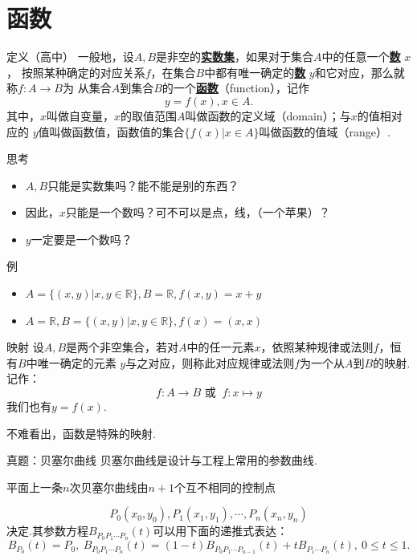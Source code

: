 \documentclass[]{beamer}
\begin{document}
\section{函数}

\begin{frame}{定义（高中）}
    一般地，设$A,B$是非空的\underline{\textbf{实数集}}，如果对于集合$A$中的任意一个\underline{\textbf{数}} $x$，
    按照某种确定的对应关系$f$，在集合$B$中都有唯一确定的\underline{\textbf{数}} $y$和它对应，那么就称$f:A\rightarrow B$为
    从集合$A$到集合$B$的一个\underline{\textbf{函数}}（function），记作
    \[
    y=f(x),x\in A.
    \]
    其中，$x$叫做自变量，$x$的取值范围$A$叫做函数的定义域（domain）；与$x$的值相对应的
    $y$值叫做函数值，函数值的集合$\{f(x)|x\in A\}$叫做函数的值域（range）.
\end{frame}

\begin{frame}{思考}
    \begin{itemize}
        \item $A,B$只能是实数集吗？能不能是别的东西？
        \item 因此，$x$只能是一个数吗？可不可以是点，线，（一个苹果）？
        \item $y$一定要是一个数吗？
    \end{itemize}
\end{frame}

\begin{frame}{例}
    \begin{itemize}
        \item $A=\{(x,y)|x,y\in \mathbb{R}\}, B=\mathbb{R},f(x,y)=x+y$
        \item $A=\mathbb{R}, B=\{(x,y)|x,y\in \mathbb{R}\}, f(x)=(x,x)$
    \end{itemize}
\end{frame}

\begin{frame}{映射}
    设$A,B$是两个非空集合，若对$A$中的任一元素$x$，依照某种规律或法则$f$，恒有$B$中唯一确定的元素
    $y$与之对应，则称此对应规律或法则$f$为一个从$A$到$B$的映射.记作：
    \[
    f:A\rightarrow B \text{ 或 }\ f:x\mapsto y
    \]
    我们也有$y=f(x)$.

    不难看出，函数是特殊的映射.
\end{frame}

\begin{frame}{真题：贝塞尔曲线}
    贝塞尔曲线是设计与工程上常用的参数曲线.

    平面上一条$n$次贝塞尔曲线由$n+1$个互不相同的控制点

    \[
    P_0(x_0,y_0), P_1(x_1,y_1), \cdots ,P_n(x_n,y_n)
    \]
    决定.其参数方程$B_{P_0P_1\cdots P_n}(t)$可以用下面的递推式表达：
    \[
    B_{P_0}(t)=P_0,\ B_{P_0P_1\cdots P_n}(t)=(1-t)B_{P_0P_1\cdots P_{n-1}}(t)+tB_{P_1\cdots P_n}(t),\ 0\le t\le 1.
    \]
\end{frame}
\end{document}
